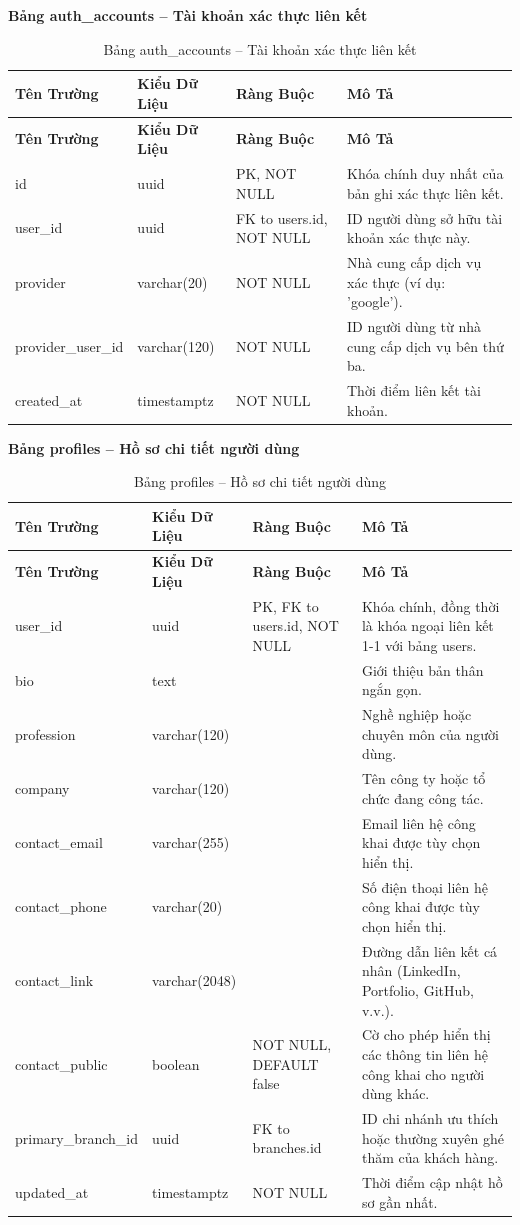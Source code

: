 \textbf{Bảng auth\_accounts -- Tài khoản xác thực liên kết}
\label{table:auth_accounts}
\begin{longtable}{|p{3cm}|p{2.5cm}|p{3.5cm}|p{5cm}|}
\caption{Bảng auth\_accounts -- Tài khoản xác thực liên kết} \\
\hline
\textbf{Tên Trường} & \textbf{Kiểu Dữ Liệu} & \textbf{Ràng Buộc} & \textbf{Mô Tả} \\
\hline
\endfirsthead
\hline
\textbf{Tên Trường} & \textbf{Kiểu Dữ Liệu} & \textbf{Ràng Buộc} & \textbf{Mô Tả} \\
\hline
\endhead
id & uuid & PK, NOT NULL & Khóa chính duy nhất của bản ghi xác thực liên kết. \\
\hline
user\_id & uuid & FK to users.id, NOT NULL & ID người dùng sở hữu tài khoản xác thực này. \\
\hline
provider & varchar(20) & NOT NULL & Nhà cung cấp dịch vụ xác thực (ví dụ: 'google'). \\
\hline
provider\_user\_id & varchar(120) & NOT NULL & ID người dùng từ nhà cung cấp dịch vụ bên thứ ba. \\
\hline
created\_at & timestamptz & NOT NULL & Thời điểm liên kết tài khoản. \\
\hline
\end{longtable}

\textbf{Bảng profiles -- Hồ sơ chi tiết người dùng}
\label{table:profiles}
\begin{longtable}{|p{3cm}|p{2.5cm}|p{3.5cm}|p{5cm}|}
\caption{Bảng profiles -- Hồ sơ chi tiết người dùng} \\
\hline
\textbf{Tên Trường} & \textbf{Kiểu Dữ Liệu} & \textbf{Ràng Buộc} & \textbf{Mô Tả} \\
\hline
\endfirsthead
\hline
\textbf{Tên Trường} & \textbf{Kiểu Dữ Liệu} & \textbf{Ràng Buộc} & \textbf{Mô Tả} \\
\hline
\endhead
user\_id & uuid & PK, FK to users.id, NOT NULL & Khóa chính, đồng thời là khóa ngoại liên kết 1-1 với bảng users. \\
\hline
bio & text & & Giới thiệu bản thân ngắn gọn. \\
\hline
profession & varchar(120) & & Nghề nghiệp hoặc chuyên môn của người dùng. \\
\hline
company & varchar(120) & & Tên công ty hoặc tổ chức đang công tác. \\
\hline
contact\_email & varchar(255) & & Email liên hệ công khai được tùy chọn hiển thị. \\
\hline
contact\_phone & varchar(20) & & Số điện thoại liên hệ công khai được tùy chọn hiển thị. \\
\hline
contact\_link & varchar(2048) & & Đường dẫn liên kết cá nhân (LinkedIn, Portfolio, GitHub, v.v.). \\
\hline
contact\_public & boolean & NOT NULL, DEFAULT false & Cờ cho phép hiển thị các thông tin liên hệ công khai cho người dùng khác. \\
\hline
primary\_branch\_id & uuid & FK to branches.id & ID chi nhánh ưu thích hoặc thường xuyên ghé thăm của khách hàng. \\
\hline
updated\_at & timestamptz & NOT NULL & Thời điểm cập nhật hồ sơ gần nhất. \\
\hline
\end{longtable}

